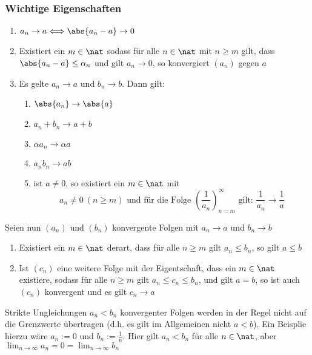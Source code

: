 \documentclass{kit}
\begin{document}
    \subsubsection{Wichtige Eigenschaften}
      \begin{enumerate}
        \item $a_n\rightarrow a\Longleftrightarrow\abs{a_n-a}\rightarrow0$
        \item Existiert ein $m\in\nat$ sodass für alle $n\in\nat$ mit $n\ge m$ gilt, dass $\abs{a_n-a}\le\alpha_n$ und gilt $a_n\rightarrow0$, so konvergiert $(a_n)$ gegen $a$
        \item Es gelte $a_n\rightarrow a$ und $b_n\rightarrow b$. Dann gilt:\\
        \begin{enumerate}[label=\roman*)]
          \item $\abs{a_n}\rightarrow\abs{a}$
          \item $a_n+b_n\rightarrow a+b$
          \item $\alpha a_n\rightarrow\alpha a$
          \item $a_nb_n\rightarrow ab$
          \item ist $a\neq0$, so existiert ein $m\in\nat$ mit
            $$a_n\neq0\ (n\ge m)\text{ und für die Folge }\left(\frac{1}{a_n}\right)^\infty_{n=m}\text{ gilt: }\frac{1}{a_n}\rightarrow\frac{1}{a}$$
        \end{enumerate}
      \end{enumerate}
      Seien nun $(a_n)$ und $(b_n)$ konvergente Folgen mit $a_n\rightarrow a$ und $b_n\rightarrow b$
      \begin{enumerate}
        \item Existiert ein $m\in\nat$ derart, dass für alle $n\ge m$ gilt $a_n\le b_n$, so gilt $a\le b$
        \item Ist $(c_n)$ eine weitere Folge mit der Eigentschaft, dass ein $m\in\nat$ existiere, sodass für alle $n\ge m$ gilt $a_n\le c_n\le b_n$, und gilt $a=b$, so ist auch $(c_n)$ konvergent und es gilt $c_n\rightarrow a$
      \end{enumerate}
      Strikte Ungleichungen $a_n<b_n$ konvergenter Folgen werden in der Regel nicht auf die Grenzwerte übertragen (d.h. es gilt im Allgemeinen nicht $a<b$).
      Ein Beisplie hierzu wäre $a_n:=0$ und $b_n:=\frac{1}{n}$. Hier gilt $a_n<b_n$ für alle $n\in\nat$, aber $\lim_{n\rightarrow\infty}a_n=0=\lim_{n\rightarrow\infty}b_n$
\pagebreak
\end{document}
